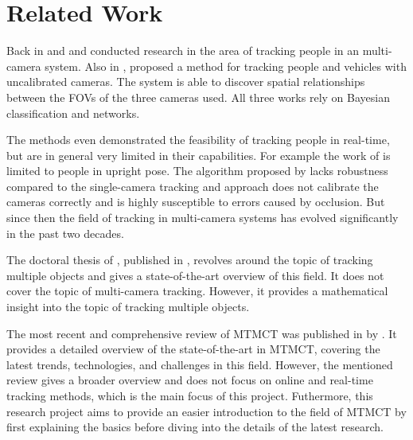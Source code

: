 \section{Related Work}\label{sec:related_work}
Back in \citeyear{Cai99} and \citeyear{Chang01} \textcite{Cai99} and \textcite{Chang01} conducted research in the area of tracking people in an multi-camera system. Also in \citeyear{Khan01}, \textcite{Khan01} proposed a method for tracking people and vehicles with uncalibrated cameras. The system is able to discover spatial relationships between the FOVs of the three cameras used. All three works rely on Bayesian classification and networks. %

The methods even demonstrated the feasibility of tracking people in real-time, but are in general very limited in their capabilities. For example the work of \citeauthor{Chang01} is limited to people in upright pose. The algorithm proposed by \citeauthor{Cai99} lacks robustness compared to the single-camera tracking and \citeauthor{Khan01} approach does not calibrate the cameras correctly and is highly susceptible to errors caused by occlusion. But since then the field of tracking in multi-camera systems has evolved significantly in the past two decades.

The doctoral thesis of \textcite[Chapter 5]{Tang19}, published in \citeyear{Tang19}, revolves around the topic of tracking multiple objects and gives a state-of-the-art overview of this field. It does not cover the topic of multi-camera tracking. However, it provides a mathematical insight into the topic of tracking multiple objects.

The most recent and comprehensive review of MTMCT was published in \citeyear{Amosa23} by \textcite{Amosa23}. It provides a detailed overview of the state-of-the-art in MTMCT, covering the latest trends, technologies, and challenges in this field. However, the mentioned review gives a broader overview and does not focus on online and real-time tracking methods, which is the main focus of this project. Futhermore, this research project aims to provide an easier introduction to the field of MTMCT by first explaining the basics before diving into the details of the latest research.
